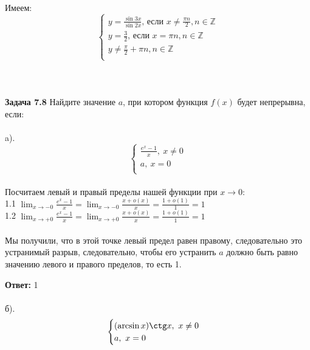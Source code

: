 \documentclass[a4paper, 12pt]{article}
\begin{document}
    \\
    \\ Имеем:
    \begin{equation*}
        \begin{cases}
            y = \frac{\sin 3x}{\sin 2x} \textbf{, если } x \neq \frac{\pi n}{2}, n \in \mathbb{Z} \\
            y = \frac{3}{2} \text{, если } x = \pi n, n \in \mathbb{Z} \\
            y \neq \frac{\pi}{2} + \pi n, n \in \mathbb{Z} \\ 
        \end{cases}
    \end{equation*}
    \\
    \\
    \\ \textbf{Задача 7.8} Найдите значение $a$, при котором функция $f(x)$ будет непрерывна, если:
    \\
    \\ a).
    \begin{equation*}
        \begin{cases}
            \frac{e^x - 1}{x},\ x \neq 0 \\
            a,\ x = 0\\
        \end{cases}
    \end{equation*}
    \\ Посчитаем левый и правый пределы нашей функции при $x \to 0$:
    \\ 1.1 $\lim_{x \to -0} \frac{e^x - 1}{x} = \lim_{x \to - 0} \frac{x + o(x)}{x} = \frac{1 + o(1)}{1} = 1$
    \\ 1.2 $\lim_{x \to +0} \frac{e^x - 1}{x} = \lim_{x \to + 0} \frac{x + o(x)}{x} = \frac{1 + o(1)}{1} = 1$
    \\
    \\ Мы получили, что в этой точке левый предел равен правому, следовательно это устранимый разрыв, следовательно, чтобы его устранить $a$ должно быть равно значению левого и правого пределов, то есть 1.
    \par \textbf{Ответ: }1
    \\
    \\ б).
    \begin{equation*}
        \begin{cases}
            (\arcsin x) \ctg x, \ x \neq 0 \\
            a, \ x = 0
        \end{cases}
    \end{equation*}
\end{document}
